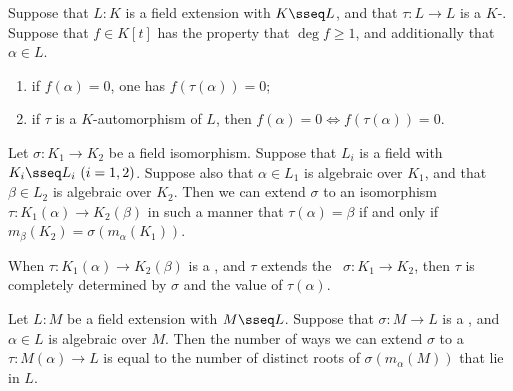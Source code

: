 \documentclass[a4paper]{article}
\begin{document}
\begin{tlemma}
  Suppose that \( L:K \) is a field extension with \( K\sseq L \), and that \( \tau:L\to L \) is a \( K \)-\homo.
  Suppose that \( f\in K[t] \) has the property that \( \deg f \geq 1 \), and additionally that \( \alpha\in L \).
  \begin{enumerate}[label=(\roman*)]
    \item if \( f(\alpha) = 0 \), one has \( f(\tau(\alpha)) = 0 \);
    \item if \( \tau \) is a \( K \)-automorphism of \( L \), then \( f(\alpha) = 0 \iff f(\tau(\alpha)) = 0 \).
  \end{enumerate}
\end{tlemma}

\begin{ttheorem}
  Let \( \sigma :K_1\to K_2 \) be a field isomorphism.
  Suppose that \( L_i \) is a field with \( K_i\sseq L_i\ (i=1,2) \).
  Suppose also that \( \alpha\in L_1 \) is algebraic over \( K_1 \), and that \( \beta\in L_2 \) is algebraic over \( K_2 \).
  Then we can extend \( \sigma \) to an isomorphism \( \tau:K_1(\alpha)\to K_2(\beta) \) in such a manner that \( \tau(\alpha) = \beta \) if and only if \( m_\beta(K_2) = \sigma(m_\alpha(K_1)) \).
  \begin{center}
  \end{center}
\end{ttheorem}

\quad When \( \tau:K_1(\alpha)\to K_2(\beta) \) is a \homo, and \( \tau \) extends the \homo~\( \sigma:K_1\to K_2 \), then \( \tau \) is completely determined by \( \sigma \) and the value of \( \tau(\alpha) \).

\begin{tcorollary}
  Let \( L:M \) be a field extension with \( M\sseq L \). Suppose that \( \sigma:M\to L \) is a \homo, and \( \alpha\in L \) is algebraic over \( M \).
  Then the number of ways we can extend \( \sigma \) to a \homo~\( \tau:M(\alpha)\to L \) is equal to the number of distinct roots of \( \sigma(m_\alpha(M)) \) that lie in \( L \).
\end{tcorollary}
\end{document}
